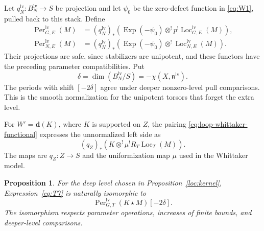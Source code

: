 \documentclass[11pt]{article}
\numberwithin{equation}{section}
\newtheorem{proposition}[theorem]{Proposition}
\theoremstyle{definition}
\theoremstyle{remark}
\begin{document}
Let $q_N^{\mathrm{lv}}:B_N^{\mathrm{lv}}\to S$ be projection and let
$\psi_0$ be the zero-defect function in \eqref{eq:W1}, pulled back to
this stack.  Define
\[
 \begin{split}
 \operatorname{Per}_{G,E}^{\mathrm{lv}}(M)
   &=(q_N^{\mathrm{lv}})_*
     \left(\operatorname{Exp}(-\psi_0)\otimes^!
                  p^!\operatorname{Loc}_{G,E}^{\mathrm{lv}}(M)\right),\\
 \operatorname{Per}_{N,E}^{\mathrm{lv}}(M)
   &=(q_N^{\mathrm{lv}})_*
     \left(\operatorname{Exp}(-\psi_0)\otimes^!
                    \operatorname{Loc}_{N,E}^{\mathrm{lv}}(M)\right).
 \end{split}
\]
Their projections are safe, since stabilizers are unipotent, and these
functors have the preceding parameter compatibilities.  Put
\[
 \delta=\dim(B_N^{\mathrm{lv}}/S)
             =-\chi(X,\mathfrak n^{\mathrm{lv}}).
\]
The periods with shift $[-2\delta]$ agree under deeper nonzero-level
pull comparisons.  This is the smooth normalization for the
unipotent torsors that forget the extra level.

For $W'=\mathbf d(K)$, where $K$ is supported on $Z$, the pairing
\eqref{eq:loop-whittaker-functional} expresses the unnormalized left side
as
\begin{equation}\label{eq:T7}
 (q_Z)_*\left(K\otimes^!\mu^!R_T
                              \operatorname{Loc}_T(M)\right).
\end{equation}
The maps are $q_Z:Z\to S$ and the uniformization map $\mu$ used in
the Whittaker model.

\begin{proposition}\label{loc:averaging}
For the deep level chosen in Proposition~\ref{loc:kernel},
Expression~\eqref{eq:T7} is naturally isomorphic to
\begin{equation}\label{eq:T8}
 \operatorname{Per}_{G,T}^{\mathrm{lv}}(K\star M)[-2\delta].
\end{equation}
The isomorphism respects parameter operations, increases of finite
bounds, and deeper-level comparisons.
\end{proposition}
\end{document}
